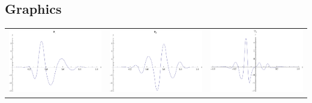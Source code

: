 \documentclass{article}
\begin{document}
\begin{landscape}
\subsection{Graphics}
\begin{tabular}{ccc}
\includegraphics[width=6.7cm]{quadratic_wavelet_1.pdf}& \includegraphics[width=6.7cm]{quadratic_wavelet_2.pdf}& \includegraphics[width=6.7cm]{quadratic_wavelet_3.pdf} \\

\end{tabular}
\end{landscape}
\end{document}
